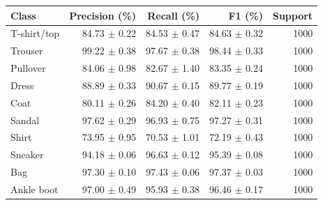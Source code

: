 \begin{tabular}{lrrrr}
\toprule
Class & Precision (\%) & Recall (\%) & F1 (\%) & Support \\
\midrule
T-shirt/top & 84.73 $\pm$ 0.22 & 84.53 $\pm$ 0.47 & 84.63 $\pm$ 0.32 & 1000 \\
Trouser & 99.22 $\pm$ 0.38 & 97.67 $\pm$ 0.38 & 98.44 $\pm$ 0.33 & 1000 \\
Pullover & 84.06 $\pm$ 0.98 & 82.67 $\pm$ 1.40 & 83.35 $\pm$ 0.24 & 1000 \\
Dress & 88.89 $\pm$ 0.33 & 90.67 $\pm$ 0.15 & 89.77 $\pm$ 0.19 & 1000 \\
Coat & 80.11 $\pm$ 0.26 & 84.20 $\pm$ 0.40 & 82.11 $\pm$ 0.23 & 1000 \\
Sandal & 97.62 $\pm$ 0.29 & 96.93 $\pm$ 0.75 & 97.27 $\pm$ 0.31 & 1000 \\
Shirt & 73.95 $\pm$ 0.95 & 70.53 $\pm$ 1.01 & 72.19 $\pm$ 0.43 & 1000 \\
Sneaker & 94.18 $\pm$ 0.06 & 96.63 $\pm$ 0.12 & 95.39 $\pm$ 0.08 & 1000 \\
Bag & 97.30 $\pm$ 0.10 & 97.43 $\pm$ 0.06 & 97.37 $\pm$ 0.03 & 1000 \\
Ankle boot & 97.00 $\pm$ 0.49 & 95.93 $\pm$ 0.38 & 96.46 $\pm$ 0.17 & 1000 \\
\bottomrule
\end{tabular}
